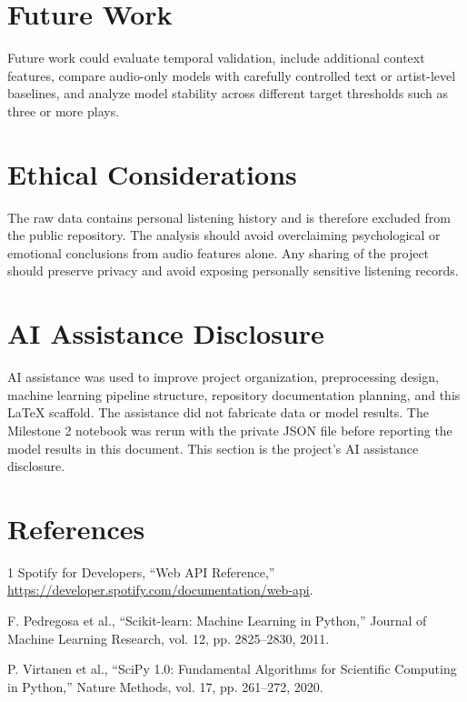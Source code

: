 \documentclass[conference]{IEEEtran}
\begin{document}
\section{Future Work}
Future work could evaluate temporal validation, include additional context features, compare audio-only models with carefully controlled text or artist-level baselines, and analyze model stability across different target thresholds such as three or more plays.

\section{Ethical Considerations}
The raw data contains personal listening history and is therefore excluded from the public repository. The analysis should avoid overclaiming psychological or emotional conclusions from audio features alone. Any sharing of the project should preserve privacy and avoid exposing personally sensitive listening records.

\section{AI Assistance Disclosure}
AI assistance was used to improve project organization, preprocessing design, machine learning pipeline structure, repository documentation planning, and this LaTeX scaffold. The assistance did not fabricate data or model results. The Milestone 2 notebook was rerun with the private JSON file before reporting the model results in this document. This section is the project's AI assistance disclosure.

\section{References}
\begin{thebibliography}{1}
Spotify for Developers, ``Web API Reference,'' \url{https://developer.spotify.com/documentation/web-api}.

F. Pedregosa et al., ``Scikit-learn: Machine Learning in Python,'' Journal of Machine Learning Research, vol. 12, pp. 2825--2830, 2011.

P. Virtanen et al., ``SciPy 1.0: Fundamental Algorithms for Scientific Computing in Python,'' Nature Methods, vol. 17, pp. 261--272, 2020.

\end{thebibliography}
\end{document}

